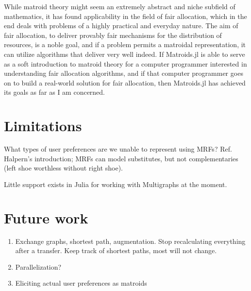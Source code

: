 While matroid theory might seem an extremely abstract and niche subfield of mathematics, it has found applicability in the field of fair allocation, which in the end deals with problems of a highly practical and everyday nature. The aim of fair allocation, to deliver provably fair mechanisms for the distribution of resources, is a noble goal, and if a problem permits a matroidal representation, it can utilize algorithms that deliver very well indeed. If Matroids.jl is able to serve as a soft introduction to matroid theory for a computer programmer interested in understanding fair allocation algorithms, and if that computer programmer goes on to build a real-world solution for fair allocation, then Matroids.jl has achieved its goals as far as I am concerned.

\section{Limitations}
What types of user preferences are we unable to represent using MRFs? Ref. Halpern's introduction; MRFs can model substitutes, but not complementaries (left shoe worthless without right shoe).

Little support exists in Julia for working with Multigraphs at the moment.

\skelpar
\section{Future work}
\begin{enumerate}
  \item Exchange graphs, shortest path, augmentation. Stop recalculating everything after a transfer. Keep track of shortest paths, most will not change.
  \item Parallelization?
  \item Eliciting actual user preferences as matroids
\end{enumerate}
\skelpar